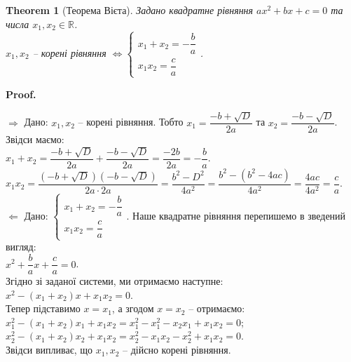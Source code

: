 \documentclass[a4paper, 10pt]{article}
\makeatletter
\def\qed{$\blacksquare$}
\def\rightproof{$\boxed{\Rightarrow}$ }
\def\leftproof{$\boxed{\Leftarrow}$ }
\theoremstyle{theoremdd}
\newtheorem{theorem}{Theorem}[subsection]
\theoremstyle{theoremdd}
\theoremstyle{theoremdd}
\theoremstyle{theoremdd}
\theoremstyle{theoremdd}
\theoremstyle{theoremdd}
\theoremstyle{theoremdd}
\theoremstyle{theoremdd}
\renewenvironment{proof}[1][Proof.\\]{\par
\pushQED{\hfill \qed}%
\normalfont \topsep6\p@\@plus6\p@\relax
\trivlist
\item\relax
{\bfseries
#1\@addpunct{.}}\hspace\labelsep\ignorespaces
}{%
\popQED\endtrivlist\@endpefalse
}
\makeatother
\begin{document}
\begin{theorem}[Теорема Вієта]
Задано квадратне рівняння $ax^2+bx+c=0$ та числа $x_1,x_2 \in \mathbb{R}$. \\
$x_1,x_2$ -- корені рівняння $\iff \begin{cases} x_1+x_2 = -\dfrac{b}{a} \\ x_1 x_2 = \dfrac{c}{a} \end{cases}$.
\end{theorem}

\begin{proof}
\rightproof Дано: $x_1,x_2$ -- корені рівняння. Тобто $x_1 = \dfrac{-b + \sqrt{D}}{2a}$ та $x_2 = \dfrac{-b - \sqrt{D}}{2a}$. Звідси маємо:\\
$x_1 + x_2 = \dfrac{-b+\sqrt{D}}{2a} + \dfrac{-b-\sqrt{D}}{2a} = \dfrac{-2b}{2a} = -\dfrac{b}{a}$.\\
$x_1 x_2 = \dfrac{(-b+\sqrt{D})(-b-\sqrt{D})}{2a \cdot 2a} = \dfrac{b^2-D^2}{4a^2} = \dfrac{b^2 - (b^2 - 4ac)}{4a^2} = \dfrac{4ac}{4a^2} = \dfrac{c}{a}$.
\bigskip \\
\leftproof Дано: $\begin{cases} x_1 + x_2 = -\dfrac{b}{a} \\ x_1 x_2 = \dfrac{c}{a} \end{cases}$. Наше квадратне рівняння перепишемо в зведений вигляд:\\
$x^2 + \dfrac{b}{a}x + \dfrac{c}{a} = 0$.\\
Згідно зі заданої системи, ми отримаємо наступне:\\
$x^2 - (x_1+x_2)x + x_1x_2 = 0$.\\
Тепер підставимо $x = x_1$, а згодом $x = x_2$ -- отримаємо:\\
$x_1^2 - (x_1+x_2)x_1 + x_1x_2 = x_1^2 - x_1^2 - x_2 x_1 + x_1 x_2 = 0$;\\
$x_2^2 - (x_1+x_2)x_2 + x_1x_2 = x_2^2 - x_1x_2 - x_2^2 + x_1x_2 = 0$.\\
Звідси випливає, що $x_1,x_2$ -- дійсно корені рівняння.

\end{proof}
\end{document}
